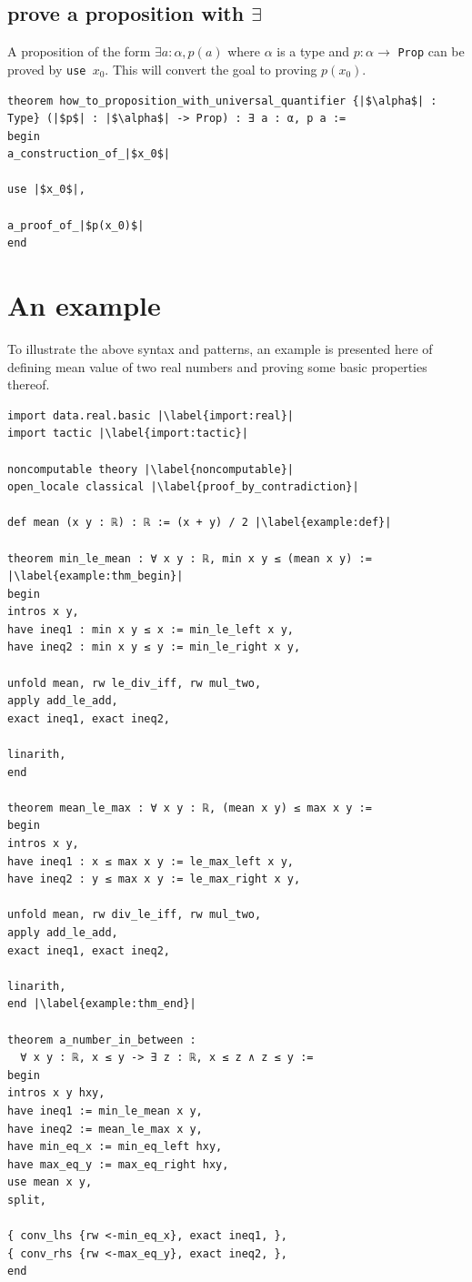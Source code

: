 \documentclass{report}
\theoremstyle{definition}
\begin{document}
\subsection{prove a proposition with $\exists$}\label{lean:exists}
A proposition of the form $\exists a:\alpha, p(a)$ where $\alpha$ is a type and $p : \alpha\to$ {\tt \small Prop}  can be proved by {\tt \small use $x_0$}. This will convert the goal to proving $p(x_0)$.

\begin{verbatim}
theorem how_to_proposition_with_universal_quantifier {|$\alpha$| : Type} (|$p$| : |$\alpha$| -> Prop) : ∃ a : α, p a :=
begin
a_construction_of_|$x_0$|

use |$x_0$|,
  
a_proof_of_|$p(x_0)$|
end
\end{verbatim}

\section{An example}
To illustrate the above syntax and patterns, an example is presented here of defining mean value of two real numbers and proving some basic properties thereof.

\begin{verbatim}
import data.real.basic |\label{import:real}|
import tactic |\label{import:tactic}|
  
noncomputable theory |\label{noncomputable}|
open_locale classical |\label{proof_by_contradiction}|  

def mean (x y : ℝ) : ℝ := (x + y) / 2 |\label{example:def}|
  
theorem min_le_mean : ∀ x y : ℝ, min x y ≤ (mean x y) := |\label{example:thm_begin}|
begin
intros x y,
have ineq1 : min x y ≤ x := min_le_left x y,
have ineq2 : min x y ≤ y := min_le_right x y,
    
unfold mean, rw le_div_iff, rw mul_two, 
apply add_le_add, 
exact ineq1, exact ineq2, 
  
linarith,
end
  
theorem mean_le_max : ∀ x y : ℝ, (mean x y) ≤ max x y :=
begin
intros x y,
have ineq1 : x ≤ max x y := le_max_left x y,
have ineq2 : y ≤ max x y := le_max_right x y,
  
unfold mean, rw div_le_iff, rw mul_two,
apply add_le_add,
exact ineq1, exact ineq2,
  
linarith,
end |\label{example:thm_end}|
  
theorem a_number_in_between : 
  ∀ x y : ℝ, x ≤ y -> ∃ z : ℝ, x ≤ z ∧ z ≤ y :=
begin
intros x y hxy,
have ineq1 := min_le_mean x y,
have ineq2 := mean_le_max x y,
have min_eq_x := min_eq_left hxy,
have max_eq_y := max_eq_right hxy,
use mean x y,
split,
  
{ conv_lhs {rw <-min_eq_x}, exact ineq1, },
{ conv_rhs {rw <-max_eq_y}, exact ineq2, },
end

\end{verbatim}
\end{document}
